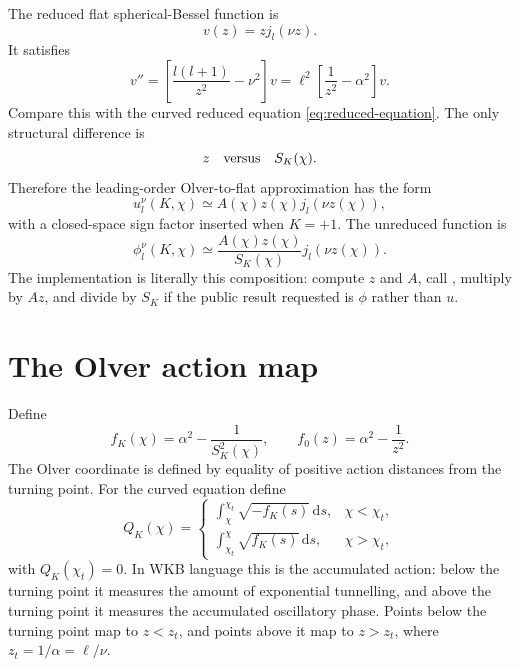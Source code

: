 \documentclass[11pt,a4paper]{article}
\newcommand{\dd}{\mathrm{d}}
\newcommand{\code}[1]{\texttt{\detokenize{#1}}}
\newcommand{\SK}{S_K}
\begin{document}
The reduced flat spherical-Bessel function is
\begin{equation}
  v(z)=zj_l(\nu z).
\end{equation}
It satisfies
\begin{equation}
  v''=\left[\frac{l(l+1)}{z^2}-\nu^2\right]v
  =\ell^2\left[\frac{1}{z^2}-\alpha^2\right]v.
  \label{eq:flat-comparison}
\end{equation}
Compare this with the curved reduced equation \eqref{eq:reduced-equation}.  The only structural difference is
\begin{equation}
  z \quad \hbox{versus} \quad \SK(\chi).
\end{equation}
Therefore the leading-order Olver-to-flat approximation has the form
\begin{equation}
  u_l^\nu(K,\chi)\simeq A(\chi)z(\chi)j_l(\nu z(\chi)),
  \label{eq:basic-olver-u}
\end{equation}
with a closed-space sign factor inserted when \(K=+1\).  The unreduced function is
\begin{equation}
  \phi_l^\nu(K,\chi)\simeq \frac{A(\chi)z(\chi)}{\SK(\chi)}j_l(\nu z(\chi)).
  \label{eq:basic-olver-phi}
\end{equation}
The implementation is literally this composition: compute \(z\) and \(A\), call \code{BJL(l,nu*z,j_l)}, multiply by \(A z\), and divide by \(\SK\) if the public result requested is \(\phi\) rather than \(u\).

\section{The Olver action map}

Define
\begin{equation}
  f_K(\chi)=\alpha^2-\frac{1}{\SK^2(\chi)},\qquad
  f_0(z)=\alpha^2-\frac{1}{z^2}.
\end{equation}
The Olver coordinate is defined by equality of positive action distances from
the turning point.  For the curved equation define
\begin{equation}
  Q_K(\chi)=
  \begin{cases}
  \displaystyle
  \int_\chi^{\chi_t}\sqrt{-f_K(s)}\,\dd s, & \chi<\chi_t,\\[1.5ex]
  \displaystyle
  \int_{\chi_t}^{\chi}\sqrt{f_K(s)}\,\dd s, & \chi>\chi_t,
  \end{cases}
  \label{eq:curved-action}
\end{equation}
with \(Q_K(\chi_t)=0\).  In WKB language this is the accumulated action: below
the turning point it measures the amount of exponential tunnelling, and above
the turning point it measures the accumulated oscillatory phase.  Points below
the turning point map to \(z<z_t\), and points above it map to \(z>z_t\), where
\(z_t=1/\alpha=\ell/\nu\).
\end{document}

